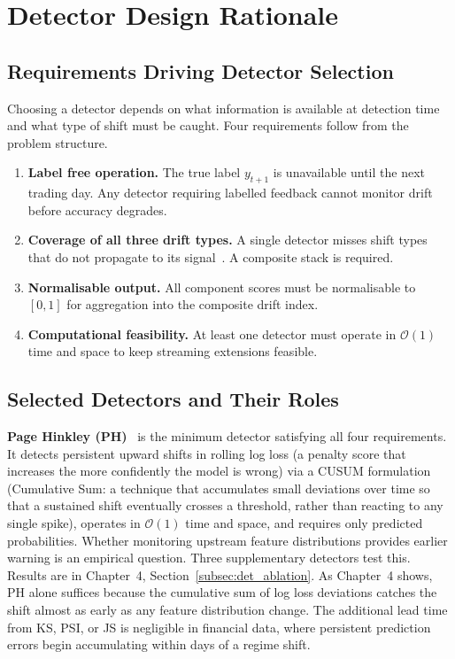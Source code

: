 \section{Detector Design Rationale}
\label{sec:detector_rationale}

\subsection{Requirements Driving Detector Selection}

Choosing a detector depends on what information is available at detection time and what type of shift must be caught. Four requirements follow from the problem structure.

\begin{enumerate}
  \item \textbf{Label free operation.} The true label $y_{t+1}$ is unavailable until
    the next trading day. Any detector requiring labelled feedback cannot monitor
    drift before accuracy degrades.
  \item \textbf{Coverage of all three drift types.} A single detector misses shift
    types that do not propagate to its signal~\cite{gama2014survey}. A composite
    stack is required.
  \item \textbf{Normalisable output.} All component scores must be normalisable to
    $[0,1]$ for aggregation into the composite drift index.
  \item \textbf{Computational feasibility.} At least one detector must operate in
    $\mathcal{O}(1)$ time and space to keep streaming extensions feasible.
\end{enumerate}

\subsection{Selected Detectors and Their Roles}

\textbf{Page Hinkley (PH)}~\cite{page1954,mouss2004} is the minimum detector satisfying all four requirements. It detects persistent upward shifts in rolling log loss (a penalty score that increases the more confidently the model is wrong) via a CUSUM formulation (Cumulative Sum: a technique that accumulates small deviations over time so that a sustained shift eventually crosses a threshold, rather than reacting to any single spike), operates in $\mathcal{O}(1)$ time and space, and requires only predicted probabilities. Whether monitoring upstream feature distributions provides earlier warning is an empirical question. Three supplementary detectors test this. Results are in Chapter~4, Section~\ref{subsec:det_ablation}. As Chapter~4 shows, PH alone suffices because the cumulative sum of log loss deviations catches the shift almost as early as any feature distribution change. The additional lead time from KS, PSI, or JS is negligible in financial data, where persistent prediction errors begin accumulating within days of a regime shift.

